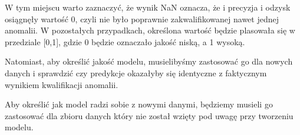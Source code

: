 \documentclass[
]{article}
\newenvironment{Shaded}{\begin{snugshade}}{\end{snugshade}}
\newcommand{\ControlFlowTok}[1]{\textcolor[rgb]{0.13,0.29,0.53}{\textbf{#1}}}
\newcommand{\DataTypeTok}[1]{\textcolor[rgb]{0.13,0.29,0.53}{#1}}
\newcommand{\DecValTok}[1]{\textcolor[rgb]{0.00,0.00,0.81}{#1}}
\newcommand{\FloatTok}[1]{\textcolor[rgb]{0.00,0.00,0.81}{#1}}
\newcommand{\KeywordTok}[1]{\textcolor[rgb]{0.13,0.29,0.53}{\textbf{#1}}}
\newcommand{\NormalTok}[1]{#1}
\newcommand{\OperatorTok}[1]{\textcolor[rgb]{0.81,0.36,0.00}{\textbf{#1}}}
\newcommand{\StringTok}[1]{\textcolor[rgb]{0.31,0.60,0.02}{#1}}
\begin{document}
W tym miejscu warto zaznaczyć, że wynik NaN oznacza, że i precyzja i
odzysk osiągnęły wartość 0, czyli nie było poprawnie zakwalifikowanej
nawet jednej anomalii. W pozostałych przypadkach, określona wartość
będzie plasowała się w przedziale {[}0,1{]}, gdzie 0 będzie oznaczało
jakość niską, a 1 wysoką.

Natomiast, aby określić jakość modelu, musielibyśmy zastosować go dla
nowych danych i sprawdzić czy predykcje okazałyby się identyczne z
faktycznym wynikiem kwalifikacji anomalii.

Aby określić jak model radzi sobie z nowymi danymi, będziemy musieli go
zastosować dla zbioru danych który nie został wzięty pod uwagę przy
tworzeniu modelu.

\begin{Shaded}
\end{Shaded}
\end{document}
